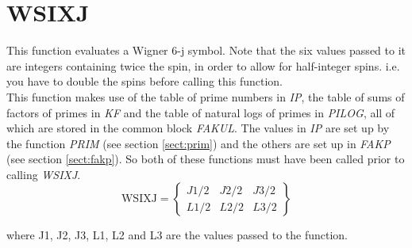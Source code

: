 \section{WSIXJ}
\label{sect:wsixj}

\noindent This function evaluates a Wigner 6-j symbol. Note that the six
values passed to it are integers containing twice the spin, in order to
allow for half-integer spins. i.e. you have to double the spins before
calling this function.\\

\noindent This function makes use of the table of prime numbers in {\em IP},
the table of sums of factors of primes in {\em KF} and the table of natural
logs of primes in {\em PILOG}, all of which are stored in the common block
{\em FAKUL}. The values in {\em IP} are set up by the function {\em PRIM}
(see section \ref{sect:prim}) and the others are set up in {\em FAKP} (see
section \ref{sect:fakp}). So both of these functions must have been called
prior to calling {\em WSIXJ}.\\

\begin{equation}
\mathrm{WSIXJ} =
\begin{Bmatrix}
J1 / 2 & J2 / 2 & J3 / 2\\
L1 / 2 & L2 / 2 & L3 / 2
\end{Bmatrix}
\end{equation}

\noindent where J1, J2, J3, L1, L2 and L3 are the values passed to the
function.\\
